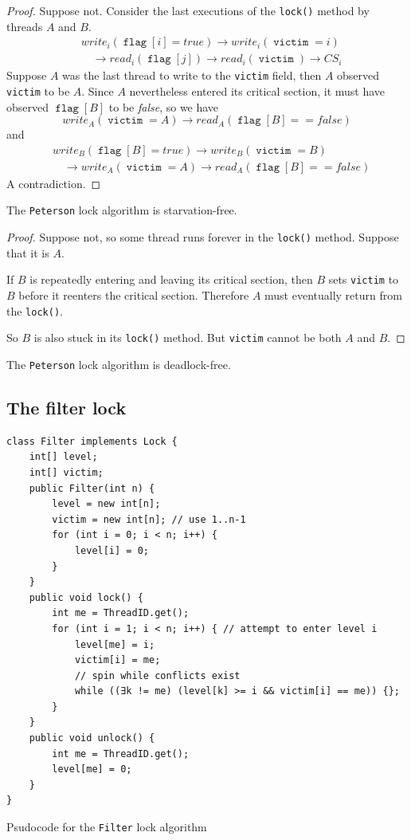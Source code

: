 \documentclass[11pt]{article}
\DeclareMathOperator{\flag}{\texttt{flag}}
\DeclareMathOperator{\victim}{\texttt{victim}}
\begin{document}
\begin{proof}
Suppose not. Consider the last executions of the \texttt{lock()} method by threads \(A\) and \(B\).
\begin{align*}
&write_i(\flag[i]=true)\to write_i(\victim=i)\\&\quad\to read_i(\flag[j])\to read_i(\victim)\to CS_i
\end{align*}
Suppose \(A\) was the last thread to write to the \texttt{victim} field, then \(A\) observed \texttt{victim} to be
\(A\). Since \(A\) nevertheless entered its critical section, it must have observed \(\flag[B]\) to be
\emph{false}, so we have
\begin{equation*}
write_A(\victim=A)\to read_A(\flag[B]==false)
\end{equation*}
and
\begin{align*}
&write_B(\flag[B]=true)\to write_B(\victim=B)\\&\quad\to write_A(\victim=A)\to read_A(\flag[B]==false)
\end{align*}
A contradiction.
\end{proof}

\begin{lemma}[]
The \texttt{Peterson} lock algorithm is starvation-free.
\end{lemma}

\begin{proof}
Suppose not, so some thread runs forever in the \texttt{lock()} method. Suppose that it is \(A\).

If \(B\) is repeatedly entering and leaving its critical section, then \(B\) sets \texttt{victim} to \(B\)
before it reenters the critical section. Therefore \(A\) must eventually return from the \texttt{lock()}.

So \(B\) is also stuck in its \texttt{lock()} method. But \texttt{victim} cannot be both \(A\) and \(B\).
\end{proof}

\begin{corollary}[]
The \texttt{Peterson} lock algorithm is deadlock-free.
\end{corollary}
\subsection{The filter lock}
\label{sec:org0facba8}
\begin{listing}[htbp]
\begin{verbatim}
class Filter implements Lock {
    int[] level;
    int[] victim;
    public Filter(int n) {
        level = new int[n];
        victim = new int[n]; // use 1..n-1
        for (int i = 0; i < n; i++) {
            level[i] = 0;
        }
    }
    public void lock() {
        int me = ThreadID.get();
        for (int i = 1; i < n; i++) { // attempt to enter level i
            level[me] = i;
            victim[i] = me;
            // spin while conflicts exist
            while ((∃k != me) (level[k] >= i && victim[i] == me)) {};
        }
    }
    public void unlock() {
        int me = ThreadID.get();
        level[me] = 0;
    }
}
\end{verbatim}
\caption{\label{}Psudocode for the \texttt{Filter} lock algorithm}
\end{listing}
\end{document}
